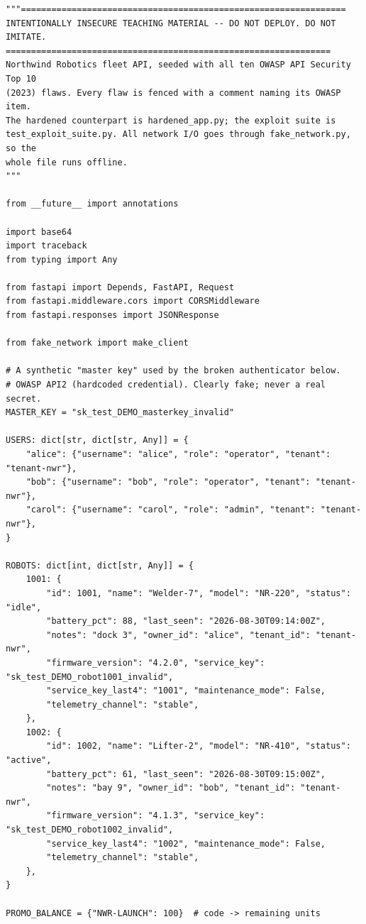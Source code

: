 \begin{verbatim}
"""================================================================
INTENTIONALLY INSECURE TEACHING MATERIAL -- DO NOT DEPLOY. DO NOT IMITATE.
================================================================
Northwind Robotics fleet API, seeded with all ten OWASP API Security Top 10
(2023) flaws. Every flaw is fenced with a comment naming its OWASP item.
The hardened counterpart is hardened_app.py; the exploit suite is
test_exploit_suite.py. All network I/O goes through fake_network.py, so the
whole file runs offline.
"""

from __future__ import annotations

import base64
import traceback
from typing import Any

from fastapi import Depends, FastAPI, Request
from fastapi.middleware.cors import CORSMiddleware
from fastapi.responses import JSONResponse

from fake_network import make_client

# A synthetic "master key" used by the broken authenticator below.
# OWASP API2 (hardcoded credential). Clearly fake; never a real secret.
MASTER_KEY = "sk_test_DEMO_masterkey_invalid"

USERS: dict[str, dict[str, Any]] = {
    "alice": {"username": "alice", "role": "operator", "tenant": "tenant-nwr"},
    "bob": {"username": "bob", "role": "operator", "tenant": "tenant-nwr"},
    "carol": {"username": "carol", "role": "admin", "tenant": "tenant-nwr"},
}

ROBOTS: dict[int, dict[str, Any]] = {
    1001: {
        "id": 1001, "name": "Welder-7", "model": "NR-220", "status": "idle",
        "battery_pct": 88, "last_seen": "2026-08-30T09:14:00Z",
        "notes": "dock 3", "owner_id": "alice", "tenant_id": "tenant-nwr",
        "firmware_version": "4.2.0", "service_key": "sk_test_DEMO_robot1001_invalid",
        "service_key_last4": "1001", "maintenance_mode": False,
        "telemetry_channel": "stable",
    },
    1002: {
        "id": 1002, "name": "Lifter-2", "model": "NR-410", "status": "active",
        "battery_pct": 61, "last_seen": "2026-08-30T09:15:00Z",
        "notes": "bay 9", "owner_id": "bob", "tenant_id": "tenant-nwr",
        "firmware_version": "4.1.3", "service_key": "sk_test_DEMO_robot1002_invalid",
        "service_key_last4": "1002", "maintenance_mode": False,
        "telemetry_channel": "stable",
    },
}

PROMO_BALANCE = {"NWR-LAUNCH": 100}  # code -> remaining units



\end{verbatim}

